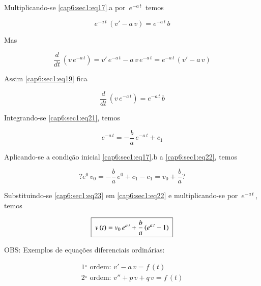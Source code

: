 Multiplicando-se \ref{cap6:sec1:eq17}.a por $ \, e^{-a\,t} \, $ temos

\begin{equation}
 \label{cap6:sec1:eq19}
 e^{-a\,t} \, (v' - a \, v) = e^{-a\,t} \, b
\end{equation}

Mas

\begin{equation}
 \label{cap6:sec1:eq20}
 \frac{d}{dt} \, (v \, e^{-a\,t}) = v' \, e^{-a\,t} - a \, v \, e^{-a\,t} = e^{-a\,t} \, (v' - a \, v)
\end{equation}

Assim \ref{cap6:sec1:eq19} fica

\begin{equation}
 \label{cap6:sec1:eq21}
 \frac{d}{dt} \, (v \, e^{-a\,t}) = e^{-a\,t} \, b
\end{equation}

Integrando-se \ref{cap6:sec1:eq21}, temos

\begin{equation}
 \label{cap6:sec1:eq22}
 e^{-a\,t} = - \frac{b}{a} \, e^{-a\,t} + c_1
\end{equation}

Aplicando-se a condição inicial \ref{cap6:sec1:eq17}.b a \ref{cap6:sec1:eq22}, temos

\begin{equation}
 \label{cap6:sec1:eq23}
 ? e^0 \, v_0 = - \frac{b}{a} \, e^0 + c_1 - c_1 = v_0 + \frac{b}{a} ?
\end{equation}

Substituindo-se \ref{cap6:sec1:eq23} em \ref{cap6:sec1:eq22} e multiplicando-se por $ \, e^{-a\,t} \, $, temos

\begin{equation}
 \label{cap6:sec1:eq23}
 \mbox{ \framebox{ $ v \, (t) = v_0 \, e^{a\,t} + \displaystyle \frac{b}{a} \, (e^{a\,t} - 1) $ } }
\end{equation}

OBS: Exemplos de equações diferenciais ordinárias:

\[
 \begin{array}{l}
  1^{_a} \mbox{ ordem: } v' - a \, v = f \, (t) \\
  2^{_a} \mbox{ ordem: } v'' + p \, v + q \, v = f \, (t)
 \end{array}
\]

